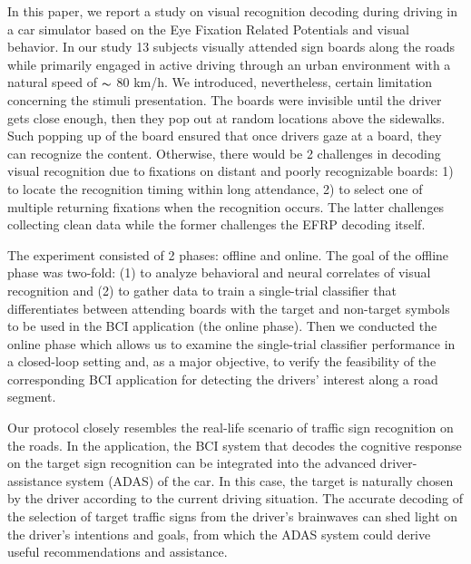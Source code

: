 \documentclass[12pt]{iopart}
\begin{document}
In this paper, we report a study on visual recognition decoding during driving
in a car simulator based on the Eye Fixation Related
Potentials and visual behavior. 
In our study 13 subjects visually attended sign boards along the roads
while primarily engaged in active driving through
an urban environment with a natural speed of $\thicksim$ 80 km/h. 
We introduced, nevertheless, certain limitation concerning 
the stimuli presentation.
The boards were invisible until the driver gets close enough,
then they pop out at random locations above the sidewalks.
Such popping up of the board ensured 
that once drivers gaze at a board, they can recognize the content.
Otherwise, there would be 2 challenges in decoding
visual recognition due to fixations on distant
and poorly recognizable boards:
1) to locate the recognition timing within long attendance,
2) to select one of multiple returning fixations when the recognition occurs.
The latter challenges collecting clean data while the former challenges
the EFRP decoding itself.

The experiment consisted of 2 phases: offline and online.
The goal of the offline phase was two-fold: (1) to analyze behavioral
and neural correlates of visual recognition and (2) to gather data to train a single-trial classifier that differentiates between attending boards with the target and non-target symbols to be used in the BCI application (the online phase).
Then we conducted the online phase which allows us to examine the single-trial classifier performance in a closed-loop setting and, as a major objective, to verify the feasibility of the corresponding BCI application for detecting the drivers' interest along a road segment.

Our protocol closely resembles the real-life scenario of traffic sign
recognition on the roads. In the application, 
the BCI system that decodes the cognitive response on the target sign
recognition can be integrated into the advanced driver-assistance system
(ADAS) of the car.
In this case, the target is naturally chosen by the driver
according to the current driving situation. 
The accurate decoding of the selection of target traffic signs 
from the driver’s brainwaves can shed light on the driver’s intentions
and goals, from which the ADAS system could derive useful 
recommendations and assistance.

\end{document}
